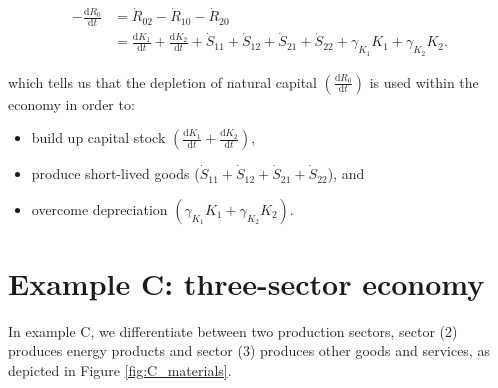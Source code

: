 \begin{align} 
	- \frac{\mathrm{d}R_{0}}{\mathrm{d}t}			&
	= \dot{R}_{02}
	- \dot{R}_{10}
	- \dot{R}_{20}									\nonumber	\\
\label{eq:B_CV_1and2}											&
	= \frac{\mathrm{d}K_{1}}{\mathrm{d}t}
	+ \frac{\mathrm{d}K_{2}}{\mathrm{d}t}
	+ \dot{S}_{11}
	+ \dot{S}_{12} 
	+ \dot{S}_{21}
	+ \dot{S}_{22}
	+ \gamma_{K_{1}}K_{1}
	+ \gamma_{K_{2}}K_{2}.
\end{align}

\noindent{}which tells us that
the depletion of natural capital
$\left(\frac{\mathrm{d}R_{0}}{\mathrm{d}t}\right)$
is used within the economy in order to:

\begin{itemize}
	\item build up capital stock
	$\left(\frac{\mathrm{d}K_{1}}{\mathrm{d}t}
	+ \frac{\mathrm{d}K_{2}}{\mathrm{d}t}\right)$,
	\item produce short-lived goods
	($\dot{S}_{11}
	+ \dot{S}_{12} 
	+ \dot{S}_{21}
	+ \dot{S}_{22}$), and
	\item overcome depreciation
	$\left(\gamma_{K_{1}}K_{1}
	+ \gamma_{K_{2}}K_{2}\right)$.
\end{itemize}


%
%

\section{Example C: three-sector economy} %
\label{sec:C_materials}

In example C, we differentiate between two production sectors, sector (2) produces energy
products and sector (3) produces other goods and services, as depicted in Figure
\ref{fig:C_materials}.

